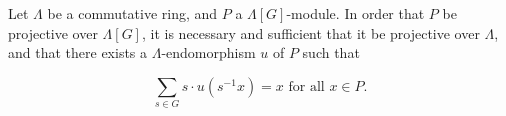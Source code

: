 Let $\Lambda$ be a commutative ring, and $P$ a $\Lambda[G]$-module. In order that $P$ be projective over $\Lambda[G]$, it is necessary and sufficient that it be projective over $\Lambda$, and that there exists a $\Lambda$-endomorphism $u$ of $P$ such that

$$\sum_{s \in G} s \cdot u(s^{-1}x) = x \text{ for all } x \in P.$$
